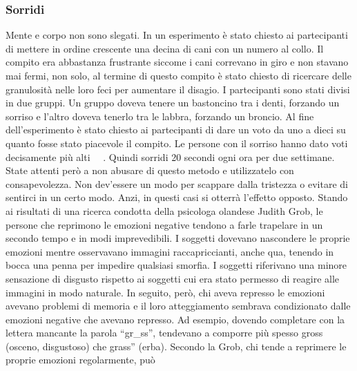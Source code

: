 \documentclass[12pt]{book} %
\begin{document}
\subsubsection{Sorridi}
Mente e corpo non sono slegati. In un esperimento è stato chiesto ai partecipanti di mettere in ordine crescente una
decina di cani con un numero al collo. Il compito era abbastanza frustrante siccome i cani correvano in giro e non
stavano mai fermi, non solo, al termine di questo compito è stato chiesto di ricercare delle granulosità nelle loro
feci per aumentare il disagio. I partecipanti sono stati divisi in due gruppi. Un gruppo doveva tenere un bastoncino
tra i denti, forzando un sorriso e l'altro doveva tenerlo tra le labbra, forzando un broncio. Al
fine dell'esperimento è stato chiesto ai partecipanti di dare un voto da uno a dieci su quanto
fosse stato piacevole il compito. Le persone con il sorriso hanno dato voti decisamente più
alti \ \ .
Quindi sorridi 20 secondi ogni ora per due settimane. State attenti però a non abusare di questo metodo e utilizzatelo
con consapevolezza. Non dev'essere un modo per scappare dalla tristezza o evitare di sentirci in
un certo modo. Anzi, in questi casi si otterrà l'effetto opposto. Stando ai risultati di una
ricerca condotta della psicologa olandese Judith Grob, le persone che reprimono le emozioni negative tendono a farle
trapelare in un secondo tempo e in modi imprevedibili. I soggetti dovevano nascondere le proprie emozioni mentre
osservavano immagini raccapriccianti, anche qua, tenendo in bocca una penna per impedire qualsiasi smorfia. I soggetti
riferivano una minore sensazione di disgusto rispetto ai soggetti cui era stato permesso di reagire alle immagini in
modo naturale. In seguito, però, chi aveva represso le emozioni avevano problemi di memoria e il loro atteggiamento
sembrava condizionato dalle emozioni negative che avevano represso. Ad esempio, dovendo completare con la lettera
mancante la parola “gr\_ss”, tendevano a comporre più spesso {\textquotedbl}gross{\textquotedbl} (osceno, disgustoso)
che {\textquotedbl}grass” (erba). Secondo la Grob, chi tende a reprimere le proprie emozioni regolarmente, può
\end{document}
